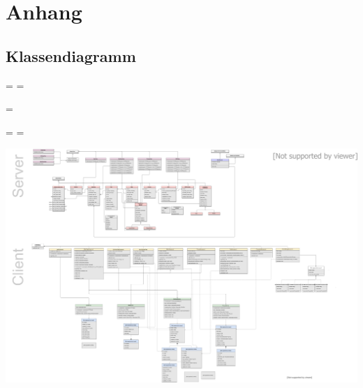 \chapter{Anhang}

	\section{Klassendiagramm}
	
	
	
	\newpage
		
	\pdfpageheight
	\pdfpagewidth
	\pdfpageheight=\paperheight
	\pdfpagewidth=\paperwidth
	\textheight
	
	\begingroup 
	\vsize=\textwidth
	\textheight
	
	\textwidth=\hsize
	\textheight=\vsize
		
		
	\includegraphics{diagrams/classDiagramComplete.pdf}
%		

